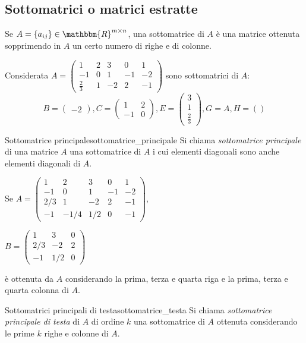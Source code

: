 \documentclass[12pt]{report}
\newcounter{definition}
\newcommand{\nmu}{}
\begin{document}
\subsection{Sottomatrici o matrici estratte}
Se $A = \{a_{ij}\} \in \mathbbm{R}^{m\times n}$, una sottomatrice di $A$ è una matrice ottenuta sopprimendo in $A$ un certo numero di righe e di colonne.
\begin{example}{}{}
Considerata $A = \begin{pmatrix}
		1 & 2 & 3 & 0 & 1 \\
		-1 & 0 & 1 & -1 & -2 \\
		\frac{2}{3} & 1 & -2 & 2 & -1
	\end{pmatrix}$
	sono sottomatrici di $A$:
	\[
	B = \begin{pmatrix}
			-2
			\end{pmatrix}, C = \begin{pmatrix}
		1 & 2 \\
		-1 & 0
	\end{pmatrix}, E = \begin{pmatrix}
		3  \\
		1  \\
		\frac{2}{3}
	\end{pmatrix}, G = A, H = ()
	\]
\end{example}
\begin{definition}{\nmu Sottomatrice principale}{sottomatrice_principale}
	Si chiama \textit{sottomatrice principale} di una matrice $A$ una sottomatrice di $A$ i cui elementi diagonali sono anche elementi diagonali di $A$.
\end{definition}
\begin{example}{}{}
Se $A = \begin{pmatrix}
1 & 2 & 3 & 0 & 1 \\
-1 & 0 & 1 & -1 & -2 \\
2/3 & 1 & -2 & 2 & -1 \\
-1 & -1/4 & 1/2 & 0 & -1
\end{pmatrix}$,

$B = \begin{pmatrix}
1 & 3 & 0 \\
2/3 & -2 & 2 \\
-1 & 1/2 & 0
\end{pmatrix}$


è ottenuta da $A$ considerando la prima, terza e quarta riga e la prima, terza e quarta colonna di $A$.
\end{example}
\begin{definition}{\nmu Sottomatrici principali di testa}{sottomatrice_testa}
	Si chiama \textit{sottomatrice principale di testa} di $A$ di ordine $k$ una sottomatrice di $A$ ottenuta considerando le prime $k$ righe e colonne di $A$.
\end{definition}
\end{document}
